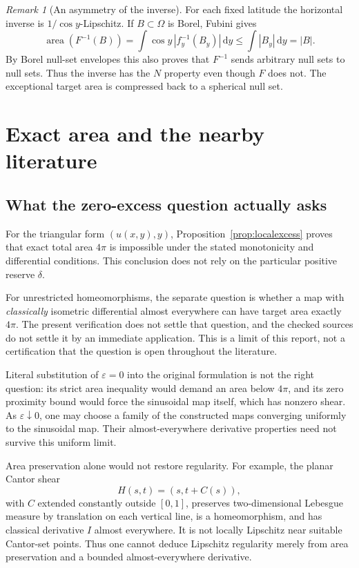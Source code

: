 \documentclass[11pt,letterpaper]{article}
\numberwithin{equation}{section}
\theoremstyle{remark}
\newtheorem{remark}[theorem]{Remark}
\newcommand{\dd}{\,\mathrm d}
\newcommand{\area}{\operatorname{area}}
\newcommand{\eps}{\varepsilon}
\begin{document}
\begin{remark}[An asymmetry of the inverse]
For each fixed latitude the horizontal inverse is $1/\cos y$-Lipschitz. If $B\subset\Omega$ is Borel, Fubini gives
\[
 \area(F^{-1}(B))
 =\int\cos y\,|f_y^{-1}(B_y)|\dd y\le\int|B_y|\dd y=|B|.
\]
By Borel null-set envelopes this also proves that $F^{-1}$ sends arbitrary null sets to null sets. Thus the inverse has the $N$ property even though $F$ does not. The exceptional target area is compressed back to a spherical null set.
\end{remark}

\section{Exact area and the nearby literature}
\label{sec:literature}

\subsection{What the zero-excess question actually asks}

For the triangular form $(u(x,y),y)$, Proposition~\ref{prop:localexcess} proves that exact total area $4\pi$ is impossible under the stated monotonicity and differential conditions. This conclusion does not rely on the particular positive reserve $\delta$.

For unrestricted homeomorphisms, the separate question is whether a map with \emph{classically} isometric differential almost everywhere can have target area exactly $4\pi$. The present verification does not settle that question, and the checked sources do not settle it by an immediate application. This is a limit of this report, not a certification that the question is open throughout the literature.

Literal substitution of $\eps=0$ into the original formulation is not the right question: its strict area inequality would demand an area below $4\pi$, and its zero proximity bound would force the sinusoidal map itself, which has nonzero shear. As $\eps\downarrow0$, one may choose a family of the constructed maps converging uniformly to the sinusoidal map. Their almost-everywhere derivative properties need not survive this uniform limit.

Area preservation alone would not restore regularity. For example, the planar Cantor shear
\[
 H(s,t)=(s,t+C(s)),
\]
with $C$ extended constantly outside $[0,1]$, preserves two-dimensional Lebesgue measure by translation on each vertical line, is a homeomorphism, and has classical derivative $I$ almost everywhere. It is not locally Lipschitz near suitable Cantor-set points. Thus one cannot deduce Lipschitz regularity merely from area preservation and a bounded almost-everywhere derivative.
\end{document}
